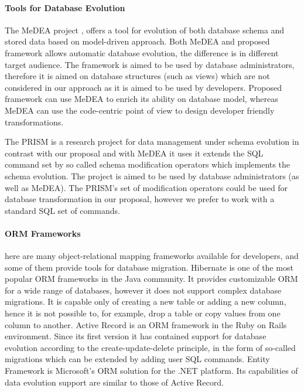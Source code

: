 \documentclass[11pt]{article}
\begin{document}
\paragraph{Tools for Database Evolution} The MeDEA project \cite{Meda:Main}, \cite{Meda:MDDViewBasedEv} offers a tool for evolution of both database schema and stored data based on model-driven approach. Both MeDEA and proposed framework allows automatic database evolution, the difference is in different target audience.  The framework is aimed to be used by database administrators, therefore it is aimed on database structures (such as views) which are not considered in our approach as it is aimed to be used by developers. Proposed framework can use MeDEA to enrich its ability on database model, whereas MeDEA can use the code-centric point of view to design developer friendly transformations.

The PRISM is a research project for data management under schema evolution \cite{PRISM} in contrast with our proposal and with MeDEA it uses it extends the SQL command set by so called schema modification operators which implements the schema evolution. The project is aimed to  be used by database administrators (as well as MeDEA). The PRISM's set of modification operators could be used for database transformation in our proposal, however we prefer to work with a standard SQL set of commands. 

\paragraph{ORM Frameworks} here are many object-relational mapping frameworks available for developers, and some of them provide tools for database migration. Hibernate \cite{Hibernate} is one of the most popular ORM frameworks in the Java community.  It provides customizable ORM for a wide range of databases, however it does not support complex database migrations.  It is capable only of creating a new table or adding a new column, hence it is not possible to, for example, drop a table or copy values from one column to another. Active Record \cite{Active_Record} is an ORM framework in the Ruby on Rails environment. Since its first version it has contained support for database evolution according to the create-update-delete principle, in the form of so-called migrations \cite{Rails:Migrations} which can be extended by adding user SQL commands. Entity Framework \cite{Entity_Framework} is Microsoft's ORM solution for the .NET platform. Its capabilities of data evolution support are similar to those of Active Record. 
\end{document}
